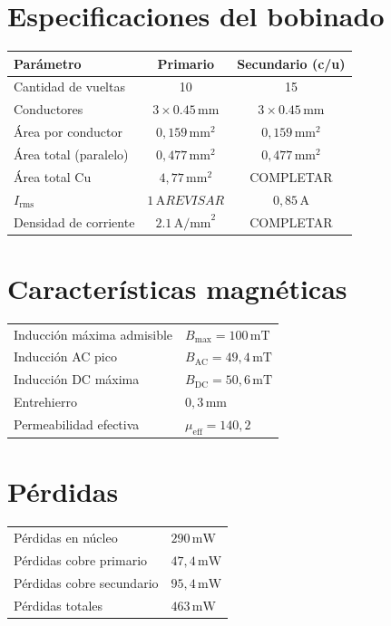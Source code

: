 \documentclass[a4paper,11pt]{article}
\begin{document}
\section*{Especificaciones del bobinado}

\begin{tabular}{lcc}
\toprule
Parámetro & Primario & Secundario (c/u) \\
\midrule
Cantidad de vueltas & 10 & 15 \\
Conductores & $3 \times 0.45\,\text{mm}$ & $3 \times 0.45\,\text{mm}$ \\
Área por conductor & $0{,}159\,\text{mm}^2$ & $0{,}159\,\text{mm}^2$ \\
Área total (paralelo) & $0{,}477\,\text{mm}^2$ & $0{,}477\,\text{mm}^2$ \\
Área total Cu & $4{,}77\,\text{mm}^2$ & COMPLETAR\\
$I_{\text{rms}}$ & $1\,\text{A}REVISAR$ & $0,85\,\text{A}$\\
Densidad de corriente & $2.1\,\text{A/mm}^2$ & COMPLETAR \\
\bottomrule
\end{tabular}

\vspace{5mm}

\section*{Características magnéticas}

\begin{tabular}{ll}
\toprule
Inducción máxima admisible & $B_{\max} = 100\,\text{mT}$ \\
Inducción AC pico & $B_{\text{AC}} = 49{,}4\,\text{mT}$ \\
Inducción DC máxima & $B_{\text{DC}} = 50{,}6\,\text{mT}$ \\
Entrehierro & $0{,}3\,\text{mm}$ \\
Permeabilidad efectiva & $\mu_{\text{eff}} = 140{,}2$ \\
\bottomrule
\end{tabular}

\vspace{5mm}

\section*{Pérdidas}

\begin{tabular}{ll}
\toprule
Pérdidas en núcleo & $290\,\text{mW}$ \\
Pérdidas cobre primario & $47{,}4\,\text{mW}$ \\
Pérdidas cobre secundario & $95{,}4\,\text{mW}$ \\
Pérdidas totales & $463\,\text{mW}$ \\
\bottomrule
\end{tabular}
\end{document}

